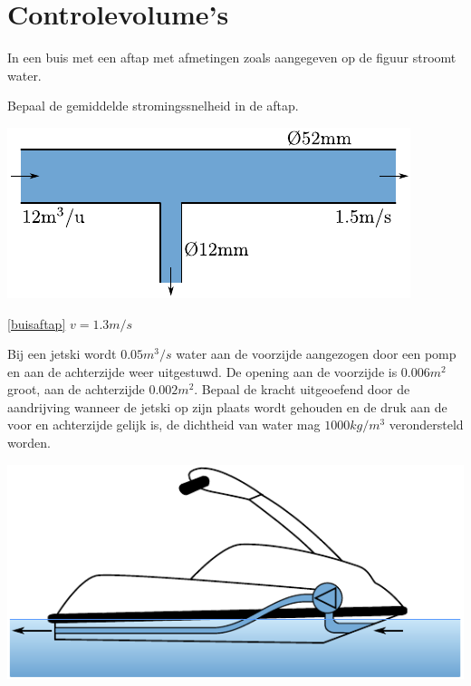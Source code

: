 \chapter{Controlevolume's}
\label{sec:Controlevolume's}
\begin{toepassing}
	\label{buisaftap}
In een buis met een aftap met afmetingen zoals aangegeven op de figuur stroomt water.
		
Bepaal de gemiddelde stromingssnelheid in de aftap.

	\centering
	\includegraphics{fig/behoudsvergelijkingen/buisaftap}
\end{toepassing}
\begin{antwoord}{\ref{buisaftap}}
	$v = 1.3\unit{m/s}$
\end{antwoord}
\begin{toepassing}
	\label{jetski}
Bij een jetski wordt $0.05\unit{m^3/s}$ water aan de voorzijde aangezogen door een pomp en aan de achterzijde weer uitgestuwd. De opening aan de voorzijde is $0.006\unit{m^2}$ groot, aan de achterzijde $0.002\unit{m^2}$. Bepaal de kracht uitgeoefend door de aandrijving wanneer de jetski op zijn plaats wordt gehouden en de druk aan de voor en achterzijde gelijk is, de dichtheid van water mag $1000\unit{kg/m^3}$ verondersteld worden.

	\centering
	\includegraphics{fig/behoudsvergelijkingen/jetski}
\end{toepassing}
